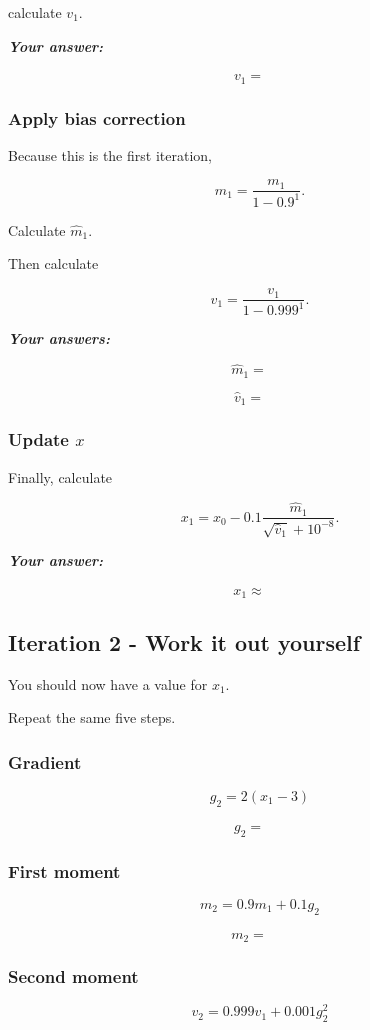 \documentclass{course_sheet}
\begin{document}
calculate $v_1$.

\textbf{\textit{Your answer:}}

\[
v_1 = {\phantom{000}}
\]

\subsubsection*{Apply bias correction}
Because this is the first iteration,

\[
\hat m_1 =
\frac{m_1}{1-0.9^1}.
\]

Calculate $\hat m_1$.

Then calculate

\[
\hat v_1 =
\frac{v_1}{1-0.999^1}.
\]

\textbf{\textit{Your answers:}}

\[
\hat m_1 = {\phantom{000}}
\]

\[
\hat v_1 = {\phantom{000}}
\]

\subsubsection*{Update $x$}
Finally, calculate

\[
x_1 =
x_0 -
0.1
\frac{\hat m_1}
{\sqrt{\hat v_1}+10^{-8}}.
\]

\textbf{\textit{Your answer:}}

\[
x_1 \approx {\phantom{000}}
\]

\clearpage
\subsection*{Iteration 2 - Work it out yourself}
You should now have a value for $x_1$.

Repeat the same five steps.

\subsubsection*{Gradient}
\[
g_2 = 2(x_1-3)
\]

\[
g_2 = {\phantom{000}}
\]

\subsubsection*{First moment}
\[
m_2 = 0.9m_1+0.1g_2
\]

\[
m_2 = {\phantom{000}}
\]

\subsubsection*{Second moment}
\[
v_2 = 0.999v_1+0.001g_2^2
\]
\end{document}
